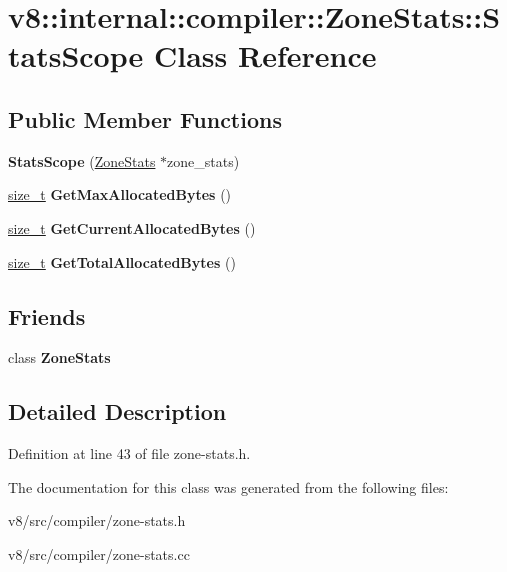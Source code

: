 \hypertarget{classv8_1_1internal_1_1compiler_1_1ZoneStats_1_1StatsScope}{}\section{v8\+:\+:internal\+:\+:compiler\+:\+:Zone\+Stats\+:\+:Stats\+Scope Class Reference}
\label{classv8_1_1internal_1_1compiler_1_1ZoneStats_1_1StatsScope}
\subsection*{Public Member Functions}
\begin{DoxyCompactItemize}
\item 
\mbox{\label{classv8_1_1internal_1_1compiler_1_1ZoneStats_1_1StatsScope_a41b6e78caba904bc12a0288718184874}} 
{\bfseries Stats\+Scope} (\mbox{\hyperlink{classv8_1_1internal_1_1compiler_1_1ZoneStats}{Zone\+Stats}} $\ast$zone\+\_\+stats)
\item 
\mbox{\label{classv8_1_1internal_1_1compiler_1_1ZoneStats_1_1StatsScope_aebe751a0c1e2cb9dc2bffd2542120117}} 
\mbox{\hyperlink{classsize__t}{size\+\_\+t}} {\bfseries Get\+Max\+Allocated\+Bytes} ()
\item 
\mbox{\label{classv8_1_1internal_1_1compiler_1_1ZoneStats_1_1StatsScope_a54fd9bb370fd925172d54295d4a389b0}} 
\mbox{\hyperlink{classsize__t}{size\+\_\+t}} {\bfseries Get\+Current\+Allocated\+Bytes} ()
\item 
\mbox{\label{classv8_1_1internal_1_1compiler_1_1ZoneStats_1_1StatsScope_a2ea75dc166b2e3770dbf55f43c298a6e}} 
\mbox{\hyperlink{classsize__t}{size\+\_\+t}} {\bfseries Get\+Total\+Allocated\+Bytes} ()
\end{DoxyCompactItemize}
\subsection*{Friends}
\begin{DoxyCompactItemize}
\item 
\mbox{\label{classv8_1_1internal_1_1compiler_1_1ZoneStats_1_1StatsScope_a17abb5173e7f458c99f63cdc52a02da2}} 
class {\bfseries Zone\+Stats}
\end{DoxyCompactItemize}


\subsection{Detailed Description}


Definition at line 43 of file zone-\/stats.\+h.



The documentation for this class was generated from the following files\+:\begin{DoxyCompactItemize}
\item 
v8/src/compiler/zone-\/stats.\+h\item 
v8/src/compiler/zone-\/stats.\+cc\end{DoxyCompactItemize}
